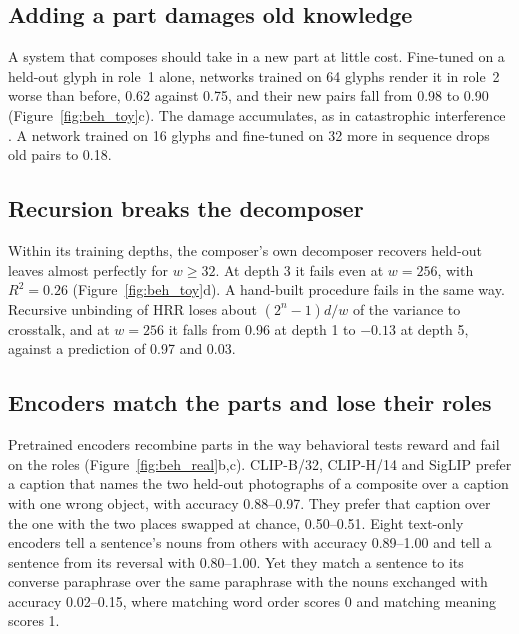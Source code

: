 \documentclass[10pt]{article}
\theoremstyle{plain}
\theoremstyle{remark}
\begin{document}
\subsection{Adding a part damages old knowledge}
\label{sec:adding}

A system that composes should take in a new part at little cost. Fine-tuned on a held-out glyph in role~1 alone, networks trained on 64 glyphs render it in role~2 worse than before, 0.62 against 0.75, and their new pairs fall from 0.98 to 0.90 (Figure~\ref{fig:beh_toy}c). The damage accumulates, as in catastrophic interference \citep{mccloskey1989}. A network trained on 16 glyphs and fine-tuned on 32 more in sequence drops old pairs to 0.18.

\subsection{Recursion breaks the decomposer}
\label{sec:depth}

Within its training depths, the composer's own decomposer recovers held-out leaves almost perfectly for $w \ge 32$. At depth 3 it fails even at $w = 256$, with $R^2 = 0.26$ (Figure~\ref{fig:beh_toy}d). A hand-built procedure fails in the same way. Recursive unbinding of HRR loses about $(2^n - 1)d/w$ of the variance to crosstalk, and at $w = 256$ it falls from 0.96 at depth 1 to $-0.13$ at depth 5, against a prediction of 0.97 and 0.03.

\subsection{Encoders match the parts and lose their roles}
\label{sec:beh_encoders}

Pretrained encoders recombine parts in the way behavioral tests reward and fail on the roles (Figure~\ref{fig:beh_real}b,c). CLIP-B/32, CLIP-H/14 and SigLIP prefer a caption that names the two held-out photographs of a composite over a caption with one wrong object, with accuracy 0.88--0.97. They prefer that caption over the one with the two places swapped at chance, 0.50--0.51. Eight text-only encoders tell a sentence's nouns from others with accuracy 0.89--1.00 and tell a sentence from its reversal with 0.80--1.00. Yet they match a sentence to its converse paraphrase over the same paraphrase with the nouns exchanged with accuracy 0.02--0.15, where matching word order scores 0 and matching meaning scores 1.
\end{document}
